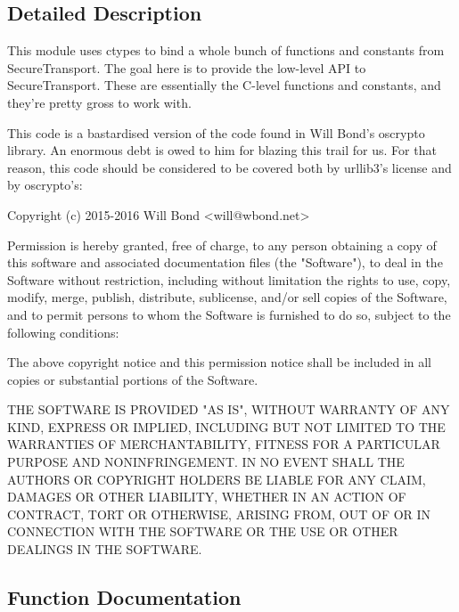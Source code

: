 \subsection{Detailed Description}
\begin{DoxyVerb}This module uses ctypes to bind a whole bunch of functions and constants from
SecureTransport. The goal here is to provide the low-level API to
SecureTransport. These are essentially the C-level functions and constants, and
they're pretty gross to work with.

This code is a bastardised version of the code found in Will Bond's oscrypto
library. An enormous debt is owed to him for blazing this trail for us. For
that reason, this code should be considered to be covered both by urllib3's
license and by oscrypto's:

Copyright (c) 2015-2016 Will Bond <will@wbond.net>

Permission is hereby granted, free of charge, to any person obtaining a
copy of this software and associated documentation files (the "Software"),
to deal in the Software without restriction, including without limitation
the rights to use, copy, modify, merge, publish, distribute, sublicense,
and/or sell copies of the Software, and to permit persons to whom the
Software is furnished to do so, subject to the following conditions:

The above copyright notice and this permission notice shall be included in
all copies or substantial portions of the Software.

THE SOFTWARE IS PROVIDED "AS IS", WITHOUT WARRANTY OF ANY KIND, EXPRESS OR
IMPLIED, INCLUDING BUT NOT LIMITED TO THE WARRANTIES OF MERCHANTABILITY,
FITNESS FOR A PARTICULAR PURPOSE AND NONINFRINGEMENT. IN NO EVENT SHALL THE
AUTHORS OR COPYRIGHT HOLDERS BE LIABLE FOR ANY CLAIM, DAMAGES OR OTHER
LIABILITY, WHETHER IN AN ACTION OF CONTRACT, TORT OR OTHERWISE, ARISING
FROM, OUT OF OR IN CONNECTION WITH THE SOFTWARE OR THE USE OR OTHER
DEALINGS IN THE SOFTWARE.
\end{DoxyVerb}
 

\subsection{Function Documentation}
\mbox{\label{namespacepip_1_1__vendor_1_1urllib3_1_1contrib_1_1__securetransport_1_1bindings_a00f809dce11dc3e2cd8e307b2e324e80}} 
